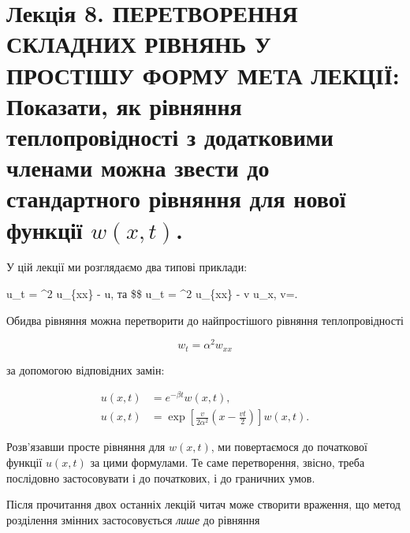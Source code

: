 \documentclass[
  ukrainian,
]{article}
\begin{document}
\section{\texorpdfstring{Лекція 8. ПЕРЕТВОРЕННЯ СКЛАДНИХ РІВНЯНЬ У
ПРОСТІШУ ФОРМУ МЕТА ЛЕКЦІЇ: Показати, як рівняння теплопровідності з
додатковими членами можна звести до стандартного рівняння для нової
функції
\(w(x,t)\).}{Лекція 8. ПЕРЕТВОРЕННЯ СКЛАДНИХ РІВНЯНЬ У ПРОСТІШУ ФОРМУ МЕТА ЛЕКЦІЇ: Показати, як рівняння теплопровідності з додатковими членами можна звести до стандартного рівняння для нової функції w(x,t).}}\label{ux43bux435ux43aux446ux456ux44f-8.-ux43fux435ux440ux435ux442ux432ux43eux440ux435ux43dux43dux44f-ux441ux43aux43bux430ux434ux43dux438ux445-ux440ux456ux432ux43dux44fux43dux44c-ux443-ux43fux440ux43eux441ux442ux456ux448ux443-ux444ux43eux440ux43cux443-ux43cux435ux442ux430-ux43bux435ux43aux446ux456ux457-ux43fux43eux43aux430ux437ux430ux442ux438-ux44fux43a-ux440ux456ux432ux43dux44fux43dux43dux44f-ux442ux435ux43fux43bux43eux43fux440ux43eux432ux456ux434ux43dux43eux441ux442ux456-ux437-ux434ux43eux434ux430ux442ux43aux43eux432ux438ux43cux438-ux447ux43bux435ux43dux430ux43cux438-ux43cux43eux436ux43dux430-ux437ux432ux435ux441ux442ux438-ux434ux43e-ux441ux442ux430ux43dux434ux430ux440ux442ux43dux43eux433ux43e-ux440ux456ux432ux43dux44fux43dux43dux44f-ux434ux43bux44f-ux43dux43eux432ux43eux457-ux444ux443ux43dux43aux446ux456ux457-wxt.}

У цій лекції ми розглядаємо два типові приклади:

u\_t = \alpha\^{}2 u\_\{xx\} - \beta u, та \$\$ u\_t = \alpha\^{}2
u\_\{xx\} - v u\_x, \qquad v=.

Обидва рівняння можна перетворити до найпростішого рівняння
теплопровідності

\[
w_t = \alpha^2 w_{xx}
\]

за допомогою відповідних замін:

\[
\begin{aligned}
u(x,t)&=e^{-\beta t}w(x,t),\\
u(x,t)&=\exp\!\left[\frac{v}{2\alpha^2}\!\left(x-\frac{vt}{2}\right)\right]w(x,t).
\end{aligned}
\]

Розв'язавши просте рівняння для \(w(x,t)\), ми повертаємося до
початкової функції \(u(x,t)\) за цими формулами. Те саме перетворення,
звісно, треба послідовно застосовувати і до початкових, і до граничних
умов.

Після прочитання двох останніх лекцій читач може створити враження, що
метод розділення змінних застосовується \emph{лише} до рівняння
\end{document}
